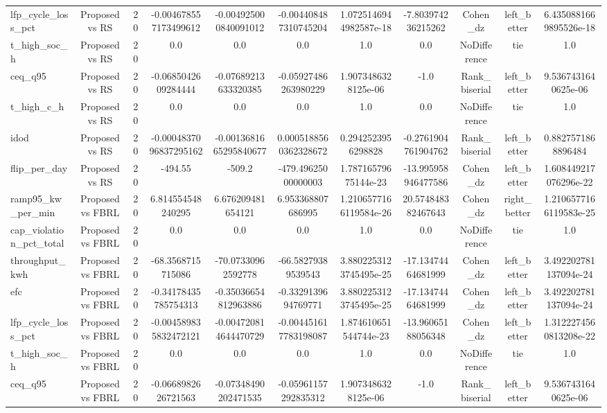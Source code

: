 \begin{table}[t]
\begin{tabular}{lcccccccccc}
lfp\_cycle\_loss\_pct & Proposed vs RS & 20 & -0.004678557173499612 & -0.004925000840091012 & -0.004408487310745204 & 1.0725146944982587e-18 & -7.803974236215262 & Cohen\_dz & left\_better & 6.4350881669895526e-18 \\
t\_high\_soc\_h & Proposed vs RS & 20 & 0.0 & 0.0 & 0.0 & 1.0 & 0.0 & NoDifference & tie & 1.0 \\
ceq\_q95 & Proposed vs RS & 20 & -0.0685042609284444 & -0.07689213633320385 & -0.05927486263980229 & 1.9073486328125e-06 & -1.0 & Rank\_biserial & left\_better & 9.5367431640625e-06 \\
t\_high\_c\_h & Proposed vs RS & 20 & 0.0 & 0.0 & 0.0 & 1.0 & 0.0 & NoDifference & tie & 1.0 \\
idod & Proposed vs RS & 20 & -0.0004837096837295162 & -0.0013681665295840677 & 0.0005188560362328672 & 0.2942523956298828 & -0.2761904761904762 & Rank\_biserial & left\_better & 0.8827571868896484 \\
flip\_per\_day & Proposed vs RS & 20 & -494.55 & -509.2 & -479.49625000000003 & 1.78716579675144e-23 & -13.995958946477586 & Cohen\_dz & left\_better & 1.608449217076296e-22 \\
ramp95\_kw\_per\_min & Proposed vs FBRL & 20 & 6.814554548240295 & 6.676209481654121 & 6.953368807686995 & 1.2106577166119584e-26 & 20.574848382467643 & Cohen\_dz & right\_better & 1.2106577166119583e-25 \\
cap\_violation\_pct\_total & Proposed vs FBRL & 20 & 0.0 & 0.0 & 0.0 & 1.0 & 0.0 & NoDifference & tie & 1.0 \\
throughput\_kwh & Proposed vs FBRL & 20 & -68.3568715715086 & -70.07330962592778 & -66.58279389539543 & 3.8802253123745495e-25 & -17.13474464681999 & Cohen\_dz & left\_better & 3.492202781137094e-24 \\
efc & Proposed vs FBRL & 20 & -0.34178435785754313 & -0.35036654812963886 & -0.3329139694769771 & 3.8802253123745495e-25 & -17.13474464681999 & Cohen\_dz & left\_better & 3.492202781137094e-24 \\
lfp\_cycle\_loss\_pct & Proposed vs FBRL & 20 & -0.004589835832472121 & -0.004720814644470729 & -0.004451617783198087 & 1.874610651544744e-23 & -13.96065188056348 & Cohen\_dz & left\_better & 1.3122274560813208e-22 \\
t\_high\_soc\_h & Proposed vs FBRL & 20 & 0.0 & 0.0 & 0.0 & 1.0 & 0.0 & NoDifference & tie & 1.0 \\
ceq\_q95 & Proposed vs FBRL & 20 & -0.0668982626721563 & -0.07348490202471535 & -0.05961157292835312 & 1.9073486328125e-06 & -1.0 & Rank\_biserial & left\_better & 9.5367431640625e-06 \\

\end{tabular}
\end{table}
